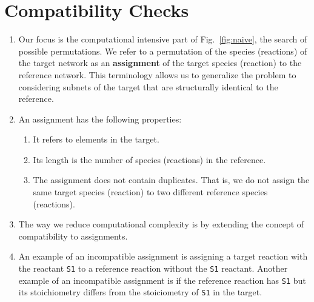 \documentclass{article}
\newcommand{\fig}[1]{Fig.~\ref{#1}}
\begin{document}
\section{Compatibility Checks}
\begin{enumerate}
    \item Our focus is the computational intensive part of \fig{fig:naive}, the search of possible permutations. We refer to a permutation of the species (reactions) of the target network as an {\bf assignment} of the target species (reaction) to the reference network. This terminology allows us to generalize the problem to considering subnets of the target that are structurally identical to the reference.
    \item An assignment has the following properties:
    \begin{enumerate}
        \item It refers to elements in the target.
        \item Its length is the number of species (reactions) in the reference.
        \item The assignment does not contain duplicates. That is, we do not assign the same target species (reaction) to two different reference species (reactions).
    \end{enumerate}
    \item The way we reduce computational complexity is by extending the concept of compatibility to assignments.
    
    \item An example of an incompatible assignment is assigning a target reaction with the reactant {\tt S1} to a reference reaction without the {\tt S1} reactant. Another example of an incompatible assignment is if the reference reaction has {\tt S1} but its stoichiometry differs from the stoiciometry of {\tt S1} in the target.
    

\end{enumerate}
\end{document}
